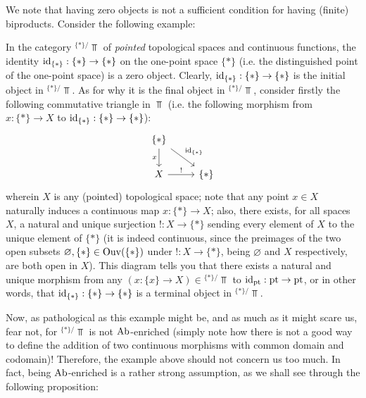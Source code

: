                 We note that having zero objects is not a sufficient condition for having (finite) biproducts. Consider the following example:
                \begin{example} \label{example: zero_objects_do_not_imply_biproducts}
                    In the category ${}^{\{*\}/}\Top$ of \textit{pointed} topological spaces and continuous functions, the identity $\mathrm{id}_{\{*\}}: \{*\} \to \{*\}$ on the one-point space $\{*\}$ (i.e. the distinguished point of the one-point space) is a zero object. Clearly, $\mathrm{id}_{\{*\}}: \{*\} \to \{*\}$ is the initial object in ${}^{\{*\}/}\Top$. As for why it is the final object in ${}^{\{*\}/}\Top$, consider firstly the following commutative triangle in $\Top$ (i.e. the following morphism from $x: \{*\} \to X$ to $\mathrm{id}_{\{*\}}: \{*\} \to \{*\}$):
                        $$
                            \begin{tikzcd}
                            	\{*\} \\
                            	X & \{*\}
                            	\arrow["x"', from=1-1, to=2-1]
                            	\arrow["{\id_{\{*\}}}", from=1-1, to=2-2]
                            	\arrow["{!}", from=2-1, to=2-2]
                            \end{tikzcd}
                        $$
                    wherein $X$ is any (pointed) topological space; note that any point $x \in X$ naturally induces a continuous map $x: \{*\} \to X$; also, there exists, for all spaces $X$, a natural and unique surjection $!: X \to \{*\}$ sending every element of $X$ to the unique element of $\{*\}$ (it is indeed continuous, since the preimages of the two open subsets $\varnothing, \{*\} \in \mathrm{Ouv}(\{*\})$ under $!: X \to \{*\}$, being $\varnothing$ and $X$ respectively, are both open in $X$). This diagram tells you that there exists a natural and unique morphism from any $(x: \{x\} \to X) \in {}^{\{*\}/}\Top$ to $\mathrm{id}_{\mathrm{pt}}: \mathrm{pt} \to \mathrm{pt}$, or in other words, that $\mathrm{id}_{\{*\}}: \{*\} \to \{*\}$ is a terminal object in ${}^{\{*\}/}\Top$. 
                \end{example}
                Now, as pathological as this example might be, and as much as it might scare us, fear not, for ${}^{\{*\}/}\Top$ is not $\mathrm{Ab}$-enriched (simply note how there is not a good way to define the addition of two continuous morphisms with common domain and codomain)! Therefore, the example above should not concern us too much. In fact, being $\mathrm{Ab}$-enriched is a rather strong assumption, as we shall see through the following proposition:
